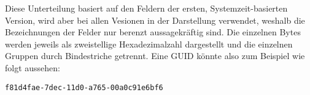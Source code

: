 Diese Unterteilung basiert auf den Feldern der ersten, Systemzeit-basierten Version, wird aber bei allen Vesionen in der Darstellung verwendet, weshalb die Bezeichnungen der Felder nur berenzt aussagekräftig sind.\cite{uuid-rfc}
Die einzelnen Bytes werden jeweils als zweistellige Hexadezimalzahl dargestellt und die einzelnen Gruppen durch Bindestriche getrennt.
Eine GUID könnte also zum Beispiel wie folgt aussehen:

\vspace{-0.5cm}

\begin{center}
    \texttt{f81d4fae-7dec-11d0-a765-00a0c91e6bf6}
\end{center}

